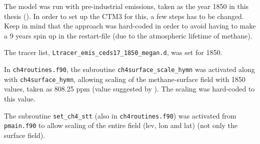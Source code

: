 
The model was run with pre-industrial emissions, taken as the year 1850 in this thesis (\cite{IPCCchapter8}). In order to set up the CTM3 for this, a few steps has to be changed. Keep in mind that the approach was hard-coded in order to avoid having to make a 9 years spin up in the restart-file (due to the atmospheric lifetime of methane). 

\medskip

The tracer list,  \texttt{Ltracer\_emis\_ceds17\_1850\_megan.d}, was set for 1850. 

\medskip

In \texttt{ch4routines.f90}, the subroutine \texttt{ch4surface\_scale\_hymn} was activated along with \texttt{ch4surface\_hymn}, allowing scaling of the methane-surface field with 1850 values, taken as 808.25 ppm (value suggested by \cite{RagnhildPersonal}). The scaling was hard-coded to this value. 

\medskip

The subroutine \texttt{set\_ch4\_stt} (also in \texttt{ch4routines.f90}) was activated from \texttt{pmain.f90} to allow scaling of the entire field (lev, lon and lat) (not only the surface field). 